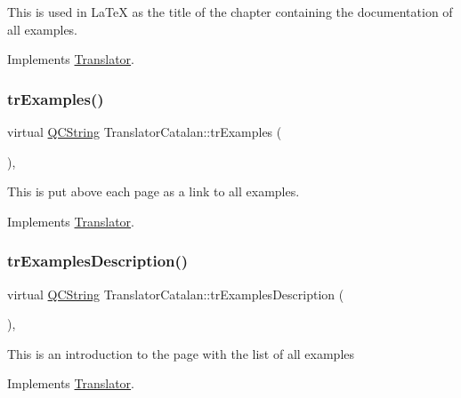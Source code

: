 This is used in La\+TeX as the title of the chapter containing the documentation of all examples. 

Implements \mbox{\hyperlink{class_translator}{Translator}}.

\mbox{\label{class_translator_catalan_af531e72583187a07dd4fa472704e5ba2}} 
\subsubsection{\texorpdfstring{trExamples()}{trExamples()}}
{\footnotesize\ttfamily virtual \mbox{\hyperlink{class_q_c_string}{Q\+C\+String}} Translator\+Catalan\+::tr\+Examples (\begin{DoxyParamCaption}{ }\end{DoxyParamCaption})\hspace{0.3cm}{\ttfamily [inline]}, {\ttfamily [virtual]}}

This is put above each page as a link to all examples. 

Implements \mbox{\hyperlink{class_translator}{Translator}}.

\mbox{\label{class_translator_catalan_ae06d909f56672c2f20d297069a85bd22}} 
\subsubsection{\texorpdfstring{trExamplesDescription()}{trExamplesDescription()}}
{\footnotesize\ttfamily virtual \mbox{\hyperlink{class_q_c_string}{Q\+C\+String}} Translator\+Catalan\+::tr\+Examples\+Description (\begin{DoxyParamCaption}{ }\end{DoxyParamCaption})\hspace{0.3cm}{\ttfamily [inline]}, {\ttfamily [virtual]}}

This is an introduction to the page with the list of all examples 

Implements \mbox{\hyperlink{class_translator}{Translator}}.

\mbox{\label{class_translator_catalan_adab0da64ca7adcc5e665f2b661d3777d}} 
